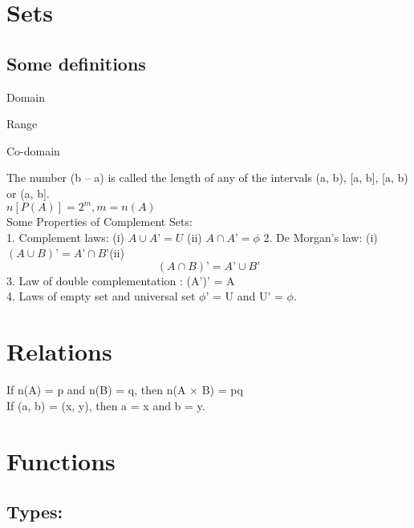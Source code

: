 \documentclass[openany]{book}
\begin{document}
\chapter{Sets}

\section{Some definitions}
\begin{description}
	\item Domain
	\item Range
	\item Co-domain
\end{description}

The number (b – a) is called the length of any of the intervals (a, b), [a, b], [a, b) or (a, b].\\
\(n[P(A)] = 2^m, m = n(A)\)\\
Some Properties of Complement Sets:\\
1. Complement laws: (i) \(A \cup A\text{'} = U \) (ii) \(A \cap A\text{'} = \phi\)
2. De Morgan’s law: (i) \((A \cup B)\text{'} = A\text{'} \cap B\text{'}\)(ii) $$(A \cap B)\text{'} = A\text{'} \cup B\text{'} $$
3. Law of double complementation : (A$\text{'}$)$\text{'}$ = A\\
4. Laws of empty set and universal set \(\phi\text{'}\) = U and U$\text{'}$ = $\phi$.\\

\section{}

\chapter{Relations}

If n(A) = p and n(B) = q, then n(A × B) = pq\\
If (a, b) = (x, y), then a = x and b = y.\\

\chapter{Functions}

\section{Types:}
\end{document}
